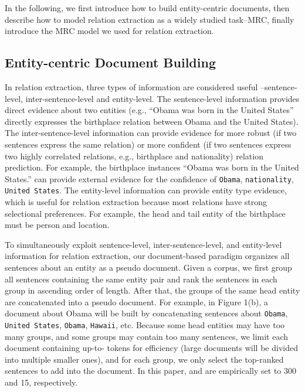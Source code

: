 \documentclass[11pt,a4paper]{article}
\begin{document}
  In the following, we first introduce how to build entity-centric documents, then describe how to model relation extraction as a widely studied task--MRC, finally introduce the MRC model we used for relation extraction.
  
  \subsection{Entity-centric Document Building}
  
  In relation extraction, three types of information are considered useful \cite{zheng_aggregating_2016,vashishth_reside_2018, yuan_crossrelation_2018, ye_distant_2019}--sentence-level, inter-sentence-level and entity-level.
  The sentence-level information provides direct evidence about two entities (e.g., ``Obama was born in the United States'' directly expresses the birthplace relation between Obama and the United States).
  The inter-sentence-level information can provide evidence for more robust (if two sentences express the same relation) or more confident (if two sentences express two highly correlated relations, e.g., birthplace and nationality) relation prediction.
  For example, the birthplace instances ``Obama was born in the United States.'' can provide external evidence for the confidence of \texttt{Obama}, \texttt{nationality}, \texttt{United States}. 
  The entity-level information can provide entity type evidence, which is useful for relation extraction because most relations have strong selectional preferences.
  For example, the head and tail entity of the birthplace must be person and location.
  
  To simultaneously exploit sentence-level, inter-sentence-level, and entity-level information for relation extraction, our document-based paradigm organizes all sentences about an entity as a pseudo document.
  Given a corpus, we first group all sentences containing the same entity pair and rank the sentences in each group in ascending order of length.
  After that, the groups of the same head entity are concatenated into a pseudo document.
  For example, in Figure 1(b), a document about Obama will be built by concatenating sentences about \texttt{Obama}, \texttt{United States}, \texttt{Obama}, \texttt{Hawaii}, etc.
  Because some head entities may have too many groups, and some groups may contain too many sentences, we limit each document containing up-to- tokens for efficiency (large documents will be divided into multiple smaller ones), and for each group, we only select the top-ranked  sentences to add into the document. In this paper,  and  are empirically set to 300 and 15, respectively.
  
\end{document}
